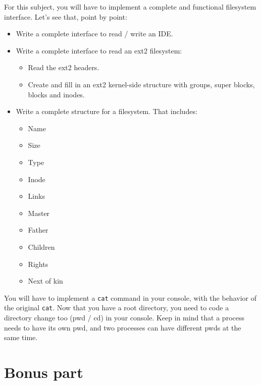 \documentclass{42-en}
\begin{document}
    For this subject, you will have to implement a complete and functional
    filesystem interface. Let's see that, point by point:
    \begin{itemize}\itemsep1pt
        \item Write a complete interface to read / write an IDE.
        \item Write a complete interface to read an ext2 filesystem:
        \begin{itemize}\itemsep1pt
            \item Read the ext2 headers.
            \item Create and fill in an ext2 kernel-side structure with groups,
            super blocks, blocks and inodes.
        \end{itemize}
        \item Write a complete structure for a filesystem. That includes:
        \begin{itemize}\itemsep1pt
            \item Name
            \item Size
            \item Type
            \item Inode
            \item Links
            \item Master
            \item Father
            \item Children
            \item Rights
            \item Next of kin
        \end{itemize}
    \end{itemize}
    You will have to implement a \texttt{cat} command in your console, with
    the behavior of the original \texttt{cat}. Now that you have a root
    directory, you need to code a directory change too (pwd / cd) in your
    console. Keep in mind that a process needs to have its own pwd, and two
    processes can have different pwds at the same time.


\chapter{Bonus part}
\end{document}
